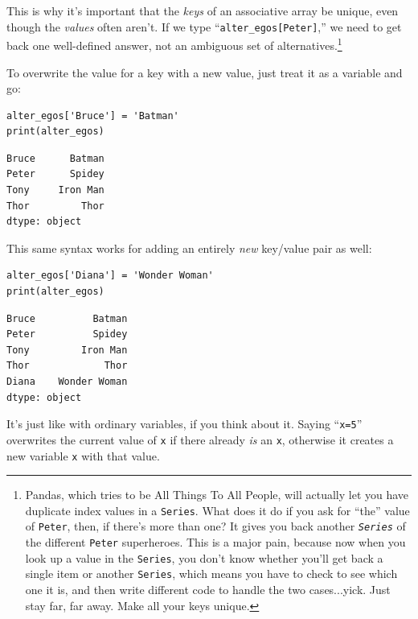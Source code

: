 This is why it's important that the \textit{keys} of an associative array be
unique, even though the \textit{values} often aren't. If we type
``\texttt{alter\_egos[\textquotesingle Peter\textquotesingle]},'' we need to
get back one well-defined answer, not an ambiguous set of
alternatives.\footnote{Pandas, which tries to be All Things To All
People\texttrademark, will actually let you have duplicate index values in a
\texttt{Series}. What does it do if you ask for ``the'' value of
\texttt{Peter}, then, if there's more than one? It gives you back another
\textit{\texttt{Series}} of the different \texttt{Peter} superheroes. This is a
major pain, because now when you look up a value in the \texttt{Series}, you
don't know whether you'll get back a single item or another \texttt{Series},
which means you have to check to see which one it is, and then write different
code to handle the two cases...yick. Just stay far, far away. Make all your
keys unique.}

To overwrite the value for a key with a new value, just treat it as a variable
and go:

\begin{Verbatim}[fontsize=\small,samepage=true,frame=single,framesep=3mm]
alter_egos['Bruce'] = 'Batman'
print(alter_egos)
\end{Verbatim}

\begin{Verbatim}[fontsize=\small,samepage=true,frame=leftline,framesep=5mm,framerule=1mm]
Bruce      Batman
Peter      Spidey
Tony     Iron Man
Thor         Thor
dtype: object
\end{Verbatim}

This same syntax works for adding an entirely \textit{new} key/value pair as
well:

\begin{Verbatim}[fontsize=\small,samepage=true,frame=single,framesep=3mm]
alter_egos['Diana'] = 'Wonder Woman'
print(alter_egos)
\end{Verbatim}

\begin{Verbatim}[fontsize=\small,samepage=true,frame=leftline,framesep=5mm,framerule=1mm]
Bruce          Batman
Peter          Spidey
Tony         Iron Man
Thor             Thor
Diana    Wonder Woman
dtype: object
\end{Verbatim}

It's just like with ordinary variables, if you think about it. Saying
``\texttt{x=5}'' overwrites the current value of \texttt{x} if there already
\textit{is} an \texttt{x}, otherwise it creates a new variable \texttt{x} with
that value.

